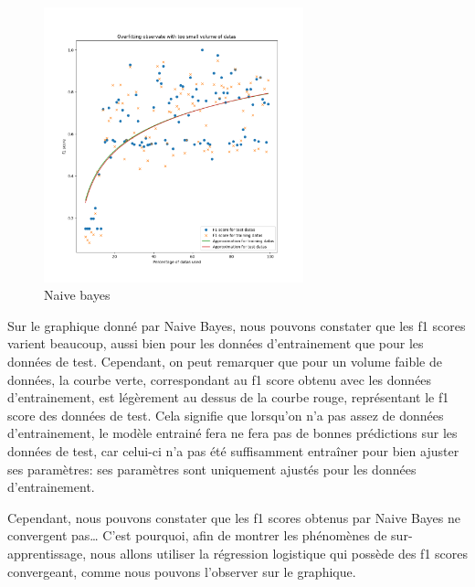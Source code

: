 \documentclass[
]{article}
\begin{document}
\begin{figure}
\centering
\includegraphics[width=0.67\textwidth,height=\textheight]{../res/overfitting_naive.png}
\caption{Naive bayes}
\end{figure}

\newpage

Sur le graphique donné par Naive Bayes, nous pouvons constater que les
f1 scores varient beaucoup, aussi bien pour les données d'entrainement
que pour les données de test. Cependant, on peut remarquer que pour un
volume faible de données, la courbe verte, correspondant au f1 score
obtenu avec les données d'entrainement, est légèrement au dessus de la
courbe rouge, représentant le f1 score des données de test. Cela
signifie que lorsqu'on n'a pas assez de données d'entrainement, le
modèle entrainé fera ne fera pas de bonnes prédictions sur les données
de test, car celui-ci n'a pas été suffisamment entraîner pour bien
ajuster ses paramètres: ses paramètres sont uniquement ajustés pour les
données d'entrainement.

Cependant, nous pouvons constater que les f1 scores obtenus par Naive
Bayes ne convergent pas\ldots{} C'est pourquoi, afin de montrer les
phénomènes de sur-apprentissage, nous allons utiliser la régression
logistique qui possède des f1 scores convergeant, comme nous pouvons
l'observer sur le graphique.
\end{document}
